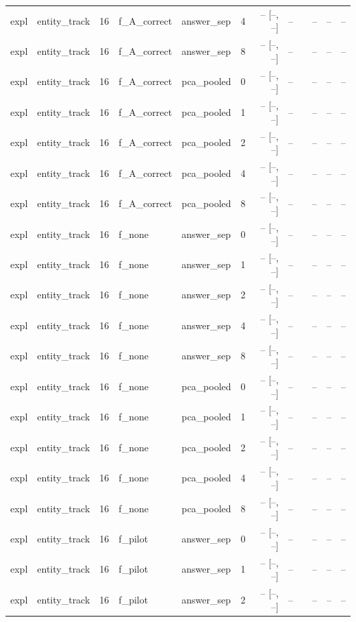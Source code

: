 \begin{tabular}{llrllrrrlrrr}
expl & entity\_track & 16 & f\_A\_correct & answer\_sep & 4 & -- [--, --] & -- &  & -- & -- & -- \\
expl & entity\_track & 16 & f\_A\_correct & answer\_sep & 8 & -- [--, --] & -- &  & -- & -- & -- \\
expl & entity\_track & 16 & f\_A\_correct & pca\_pooled & 0 & -- [--, --] & -- &  & -- & -- & -- \\
expl & entity\_track & 16 & f\_A\_correct & pca\_pooled & 1 & -- [--, --] & -- &  & -- & -- & -- \\
expl & entity\_track & 16 & f\_A\_correct & pca\_pooled & 2 & -- [--, --] & -- &  & -- & -- & -- \\
expl & entity\_track & 16 & f\_A\_correct & pca\_pooled & 4 & -- [--, --] & -- &  & -- & -- & -- \\
expl & entity\_track & 16 & f\_A\_correct & pca\_pooled & 8 & -- [--, --] & -- &  & -- & -- & -- \\
expl & entity\_track & 16 & f\_none & answer\_sep & 0 & -- [--, --] & -- &  & -- & -- & -- \\
expl & entity\_track & 16 & f\_none & answer\_sep & 1 & -- [--, --] & -- &  & -- & -- & -- \\
expl & entity\_track & 16 & f\_none & answer\_sep & 2 & -- [--, --] & -- &  & -- & -- & -- \\
expl & entity\_track & 16 & f\_none & answer\_sep & 4 & -- [--, --] & -- &  & -- & -- & -- \\
expl & entity\_track & 16 & f\_none & answer\_sep & 8 & -- [--, --] & -- &  & -- & -- & -- \\
expl & entity\_track & 16 & f\_none & pca\_pooled & 0 & -- [--, --] & -- &  & -- & -- & -- \\
expl & entity\_track & 16 & f\_none & pca\_pooled & 1 & -- [--, --] & -- &  & -- & -- & -- \\
expl & entity\_track & 16 & f\_none & pca\_pooled & 2 & -- [--, --] & -- &  & -- & -- & -- \\
expl & entity\_track & 16 & f\_none & pca\_pooled & 4 & -- [--, --] & -- &  & -- & -- & -- \\
expl & entity\_track & 16 & f\_none & pca\_pooled & 8 & -- [--, --] & -- &  & -- & -- & -- \\
expl & entity\_track & 16 & f\_pilot & answer\_sep & 0 & -- [--, --] & -- &  & -- & -- & -- \\
expl & entity\_track & 16 & f\_pilot & answer\_sep & 1 & -- [--, --] & -- &  & -- & -- & -- \\
expl & entity\_track & 16 & f\_pilot & answer\_sep & 2 & -- [--, --] & -- &  & -- & -- & -- \\

\end{tabular}
